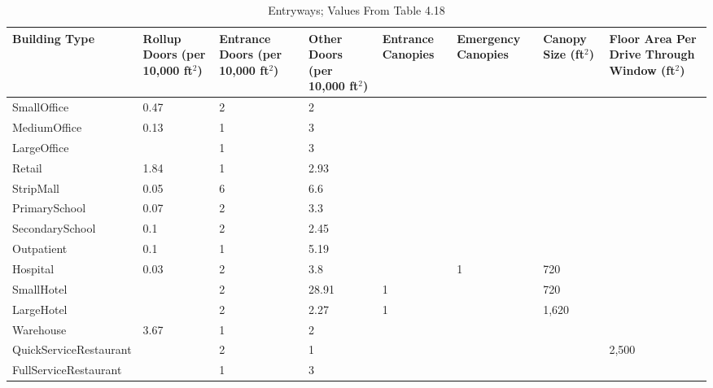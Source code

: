\begin{table}
\small
\centering
\caption[Entryways]{Entryways; Values From \cite{osti_1015277} Table 4.18}
\label{tab:entryways}
\begin{tabular}{|l|p{1.5cm}|p{1.5cm}|p{1.5cm}|p{1.5cm}|p{1.75cm}|p{1.5cm}|p{1.5cm}|}
\hline
\textbf{Building Type} & \textbf{Rollup Doors (per 10,000 ft$^2$)} & \textbf{Entrance Doors (per 10,000 ft$^2$)} & \textbf{Other Doors (per 10,000 ft$^2$)} & \textbf{Entrance Canopies} & \textbf{Emergency Canopies} & \textbf{Canopy Size (ft$^2$)} & \textbf{Floor Area Per Drive Through Window (ft$^2$)} \\ \hline
SmallOffice            & 0.47 & 2 & 2     &   &   &      &      \\ \hline
MediumOffice           & 0.13 & 1 & 3     &   &   &      &      \\ \hline
LargeOffice            &      & 1 & 3     &   &   &      &      \\ \hline
Retail                 & 1.84 & 1 & 2.93  &   &   &      &      \\ \hline
StripMall              & 0.05 & 6 & 6.6   &   &   &      &      \\ \hline
PrimarySchool          & 0.07 & 2 & 3.3   &   &   &      &      \\ \hline
SecondarySchool        & 0.1  & 2 & 2.45  &   &   &      &      \\ \hline
Outpatient             & 0.1  & 1 & 5.19  &   &   &      &      \\ \hline
Hospital               & 0.03 & 2 & 3.8   &   & 1 & 720  &      \\ \hline
SmallHotel             &      & 2 & 28.91 & 1 &   & 720  &      \\ \hline
LargeHotel             &      & 2 & 2.27  & 1 &   & 1,620 &      \\ \hline
Warehouse              & 3.67 & 1 & 2     &   &   &      &      \\ \hline
QuickServiceRestaurant &      & 2 & 1     &   &   &      & 2,500 \\ \hline
FullServiceRestaurant  &      & 1 & 3     &   &   &      &      \\ \hline

\end{tabular}
\end{table}